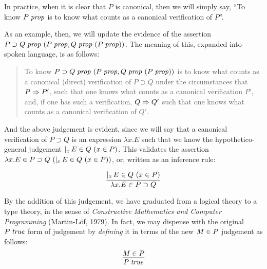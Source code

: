 \documentclass[main.tex]{subfiles}
\begin{document}
In practice, when it is clear that $P$ is canonical, then we will simply say,
``To know $P\;\mathit{prop}$ is to know what counts as a canonical verification of
$P$''.

As an example, then, we will update the evidence of the assertion
$P\supset Q\;\mathit{prop}\ (P\;\mathit{prop},Q\;\mathit{prop}\ (P\;\mathit{prop}))$. The meaning
of this, expanded into spoken language, is as follows:
\begin{quote}
  To know $P\supset
Q\;\mathit{prop}\ (P\;\mathit{prop},Q\;\mathit{prop}\ (P\;\mathit{prop}))$ is to know what counts
  as a canonical (direct) verification of $P\supset Q$ under the
  circumstances that $P\Rightarrow P'$, such that one knows what counts
  as a canonical verification $P'$, and, if one has such a verification,
  $Q\Rightarrow Q'$ such that one knows what counts as a canonical
  verification of $Q'$.
\end{quote}

And the above judgement is evident, since we will say that a canonical
verification of $P\supset Q$ is an expression $\lambda x. E$ such that
we know the hypothetico-general judgement
$\lvert_{x}\,E\in Q\ (x\in P)$. This validates the assertion
$\lambda x.E\in P\supset
Q\ (\lvert_{x}\,E\in Q\ (x\in P))$, or, written as an
inference rule:

%
\[
  \infer{
    \ver{\lambda x.E}{P\supset Q}
  }{
    \genj{x}{\hyp{\ver{E}{Q}}{\ver{x}{P}}}
  }
\]

By the addition of this judgement, we have graduated from a logical theory to a
type theory, in the sense of \emph{Constructive Mathematics and Computer
Programming} (Martin-L\"of, 1979). In fact, we may dispense with the original
$P\;\mathit{true}$ form of judgement by \emph{defining} it in terms of the new
$M\in P$ judgement as follows:
\[
  \infer{
    \istrue{P}
  }{
    \ver{M}{P}
  }
\]

\end{document}
